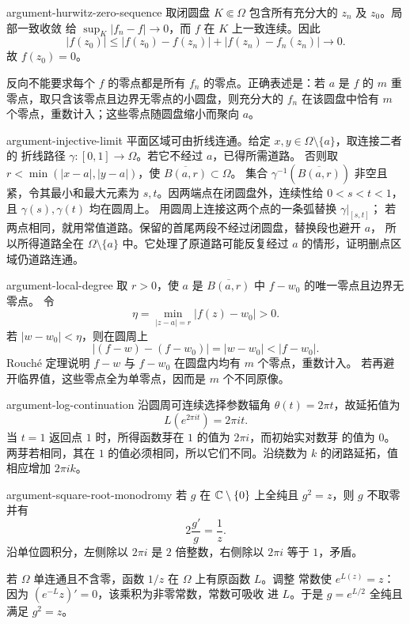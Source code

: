 \begin{solution}{argument-hurwitz-zero-sequence}
取闭圆盘 $K\Subset\Omega$ 包含所有充分大的 $z_n$ 及 $z_0$。局部一致收敛
给 $\sup_K|f_n-f|\to0$，而 $f$ 在 $K$ 上一致连续。因此
\[
 |f(z_0)|\le |f(z_0)-f(z_n)|+|f(z_n)-f_n(z_n)|\longrightarrow0.
\]
故 $f(z_0)=0$。

反向不能要求每个 $f$ 的零点都是所有 $f_n$ 的零点。正确表述是：若 $a$ 是
$f$ 的 $m$ 重零点，取只含该零点且边界无零点的小圆盘，则充分大的 $f_n$
在该圆盘中恰有 $m$ 个零点，重数计入；这些零点随圆盘缩小而聚向 $a$。
\end{solution}

\begin{solution}{argument-injective-limit}
平面区域可由折线连通。给定 $x,y\in\Omega\setminus\{a\}$，取连接二者的
折线路径 $\gamma:[0,1]\to\Omega$。若它不经过 $a$，已得所需道路。
否则取 $r<\min(|x-a|,|y-a|)$，使 $\overline{B(a,r)}\subset\Omega$。
集合 $\gamma^{-1}(\overline{B(a,r)})$ 非空且紧，令其最小和最大元素为
$s,t$。因两端点在闭圆盘外，连续性给 $0<s<t<1$，
且 $\gamma(s),\gamma(t)$ 均在圆周上。
用圆周上连接这两个点的一条弧替换 $\gamma|_{[s,t]}$；
若两点相同，就用常值道路。保留的首尾两段不经过闭圆盘，替换段也避开 $a$，
所以所得道路全在 $\Omega\setminus\{a\}$ 中。它处理了原道路可能反复经过
$a$ 的情形，证明删点区域仍道路连通。
\end{solution}

\begin{solution}{argument-local-degree}
取 $r>0$，使 $a$ 是 $\overline{B(a,r)}$ 中 $f-w_0$ 的唯一零点且边界无零点。
令
\[
 \eta=\min_{|z-a|=r}|f(z)-w_0|>0.
\]
若 $|w-w_0|<\eta$，则在圆周上
\[
 |(f-w)-(f-w_0)|=|w-w_0|<|f-w_0|.
\]
Rouché 定理说明 $f-w$ 与 $f-w_0$ 在圆盘内均有 $m$ 个零点，重数计入。
若再避开临界值，这些零点全为单零点，因而是 $m$ 个不同原像。
\end{solution}

\begin{solution}{argument-log-continuation}
沿圆周可连续选择参数辐角 $\theta(t)=2\pi t$，故延拓值为
\[
 L(e^{2\pi it})=2\pi i t.
\]
当 $t=1$ 返回点 $1$ 时，所得函数芽在 $1$ 的值为 $2\pi i$，而初始实对数芽
的值为 $0$。两芽若相同，其在 $1$ 的值必须相同，所以它们不同。沿绕数为
$k$ 的闭路延拓，值相应增加 $2\pi i k$。
\end{solution}

\begin{solution}{argument-square-root-monodromy}
若 $g$ 在 $\mathbb{C}\setminus\{0\}$ 上全纯且 $g^2=z$，则 $g$ 不取零并有
\[
 2\frac{g'}g=\frac1z.
\]
沿单位圆积分，左侧除以 $2\pi i$ 是 $2$ 倍整数，右侧除以 $2\pi i$ 等于
$1$，矛盾。

若 $\Omega$ 单连通且不含零，函数 $1/z$ 在 $\Omega$ 上有原函数 $L$。调整
常数使 $e^{L(z)}=z$：因为 $(e^{-L}z)'=0$，该乘积为非零常数，常数可吸收
进 $L$。于是 $g=e^{L/2}$ 全纯且满足 $g^2=z$。
\end{solution}

